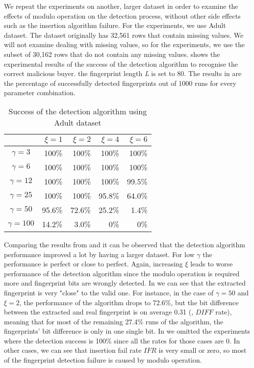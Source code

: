 We repeat the experiments on another, larger dataset in order to examine the effects of modulo operation on the detection process, without other side effects such as the insertion algorithm failure.
For the experiments, we use Adult dataset. 
The dataset originally has 32,561 rows that contain missing values.
We will not examine dealing with missing values, so for the experiments, we use the subset of 30,162 rows that do not contain any missing values.
 shows the experimental results of the success of the detection algorithm to recognise the correct malicious buyer.
the fingerprint length \textit{L} is set to 80.
The results in  are the percentage of successfully detected fingerprints out of 1000 runs for every parameter combination.

\begin{table}[ht]
    \centering
    \caption{Success of the detection algorithm using Adult dataset}
    \label{tab:detection-succ-adult}
    \begin{tabular}{|c|r|r|r|r|}
    \hline
         & $\xi=1$ & $\xi=2$ & $\xi=4$ & $\xi=6$ \\
         \hline
         $\gamma=3$ & 100\% & 100\% & 100\% & 100\% \\
         \hline
         $\gamma=6$ & 100\% & 100\% & 100\% & 100\%\\
         \hline
         $\gamma=12$ & 100\% & 100\% & 100\% & 99.5\%\\
         \hline
         $\gamma=25$ & 100\% & 100\% & 95.8\% & 64.0\% \\
         \hline
         $\gamma=50$ & 95.6\% & 72.6\% & 25.2\% & 1.4\% \\
         \hline
         $\gamma=100$ & 14.2\% & 3.0\% & 0\% & 0\% \\
         \hline
    \end{tabular}
\end{table}

Comparing the results from  and  it can be observed that the detection algorithm performance improved a lot by having a larger dataset. 
For low $\gamma$ the performance is perfect or close to perfect. 
Again, increasing $\xi$ leads to worse performance of the detection algorithm since the modulo operation is required more and fingerprint bits are wrongly detected. 
In  we can see that the extracted fingerprint is very "close" to the valid one. 
For instance, in the case of $\gamma=50$ and $\xi=2$, the performance of the algorithm drops to 72.6\%, but the bit difference between the extracted and real fingerprint is on average 0.31 (, $DIFF$ rate), meaning that for most of the remaining 27.4\% runs of the algorithm, the fingerprints' bit difference is only in one single bit. 
In  we omitted the experiments where the detection success is 100\% since all the rates for those cases are 0.
In other cases, we can see that insertion fail rate $IFR$ is very small or zero, so most of the fingerprint detection failure is caused by modulo operation. 

